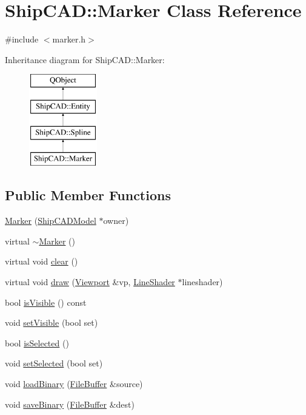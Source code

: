 \hypertarget{classShipCAD_1_1Marker}{\section{Ship\-C\-A\-D\-:\-:Marker Class Reference}
\label{classShipCAD_1_1Marker}
}


{\ttfamily \#include $<$marker.\-h$>$}

Inheritance diagram for Ship\-C\-A\-D\-:\-:Marker\-:\begin{figure}[H]
\begin{center}
\leavevmode
\includegraphics[height=4.000000cm]{classShipCAD_1_1Marker}
\end{center}
\end{figure}
\subsection*{Public Member Functions}
\begin{DoxyCompactItemize}
\item 
\hyperlink{classShipCAD_1_1Marker_a216cf592a0945f6b6923a00c9625e3bf}{Marker} (\hyperlink{classShipCAD_1_1ShipCADModel}{Ship\-C\-A\-D\-Model} $\ast$owner)
\item 
virtual \hyperlink{classShipCAD_1_1Marker_a2f3196a90d442386b0d50f54b69e6116}{$\sim$\-Marker} ()
\item 
virtual void \hyperlink{classShipCAD_1_1Marker_ac7c7eea8648562f3fa00a9e10af6ec97}{clear} ()
\item 
virtual void \hyperlink{classShipCAD_1_1Marker_a0cca647d9b32dc69b03903b024dc3091}{draw} (\hyperlink{classShipCAD_1_1Viewport}{Viewport} \&vp, \hyperlink{classShipCAD_1_1LineShader}{Line\-Shader} $\ast$lineshader)
\item 
bool \hyperlink{classShipCAD_1_1Marker_a505a790bb39356858ecf59513a76ec95}{is\-Visible} () const 
\item 
void \hyperlink{classShipCAD_1_1Marker_af21b0bac028e01ce02ea97bf6f83cccc}{set\-Visible} (bool set)
\item 
bool \hyperlink{classShipCAD_1_1Marker_aac6bc8a781945739646cfc8dd6c5b99c}{is\-Selected} ()
\item 
void \hyperlink{classShipCAD_1_1Marker_ad3bbb4a01e11e3d2885f56599a77a3d1}{set\-Selected} (bool set)
\item 
void \hyperlink{classShipCAD_1_1Marker_a0f2aa7cd6bae40784c077b89d5ebdb50}{load\-Binary} (\hyperlink{classShipCAD_1_1FileBuffer}{File\-Buffer} \&source)
\item 
void \hyperlink{classShipCAD_1_1Marker_abceb4cbb5b038eb88d0f7f26507be15c}{save\-Binary} (\hyperlink{classShipCAD_1_1FileBuffer}{File\-Buffer} \&dest)
\end{DoxyCompactItemize}
